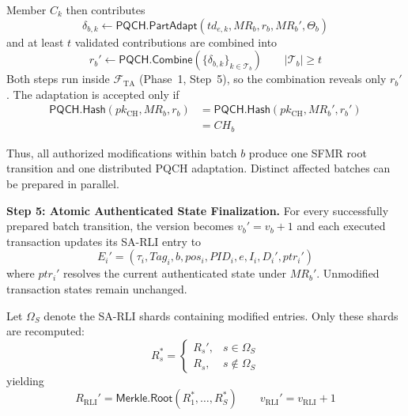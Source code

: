 \documentclass[lettersize,journal]{IEEEtran}
\begin{document}
Member $C_k$ then contributes
\begin{equation}
\delta_{b,k}
\leftarrow
\mathsf{PQCH.PartAdapt}
(td_{e,k},MR_b,r_b,MR_b',\Theta_b)
\end{equation}
and at least $t$ validated contributions are combined into
\begin{equation}
r_b'
\leftarrow
\mathsf{PQCH.Combine}
(\{\delta_{b,k}\}_{k\in\mathcal{T}_b})
\qquad
|\mathcal{T}_b|\geq t
\end{equation}
Both steps run inside $\mathcal{F}_{\mathrm{TA}}$ (Phase~1, Step~5), so
the combination reveals only $r_b'$. The adaptation is accepted only if
\begin{equation}
\begin{aligned}
\mathsf{PQCH.Hash}(pk_{\mathrm{CH}},MR_b,r_b)
&=
\mathsf{PQCH.Hash}(pk_{\mathrm{CH}},MR_b',r_b')\\
&=CH_b
\end{aligned}
\label{eq:pqch_cont}
\end{equation}

Thus, all authorized modifications within batch $b$ produce one SFMR
root transition and one distributed PQCH adaptation. Distinct affected
batches can be prepared in parallel.

\medskip
\noindent\textbf{Step 5: Atomic Authenticated State Finalization.}
For every successfully prepared batch transition, the version becomes
$v_b'=v_b+1$ and each executed transaction updates its SA-RLI entry to
\begin{equation}
E_i'=(\tau_i,Tag_i,b,pos_i,PID_i,e,I_i,D_i',ptr_i')
\end{equation}
where $ptr_i'$ resolves the current authenticated state under $MR_b'$.
Unmodified transaction states remain unchanged.

Let $\Omega_S$ denote the SA-RLI shards containing modified entries.
Only these shards are recomputed:
\begin{equation}
R_s^{*}=
\begin{cases}
R_s', & s\in\Omega_S\\
R_s,  & s\notin\Omega_S
\end{cases}
\end{equation}
yielding
\begin{equation}
R_{\mathrm{RLI}}'
=
\mathsf{Merkle.Root}(R_1^{*},\ldots,R_S^{*})
\qquad
v_{\mathrm{RLI}}'=v_{\mathrm{RLI}}+1
\end{equation}
\end{document}
